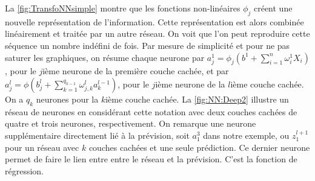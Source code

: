 \begin{figure}[h]
\end{figure}

La \autoref{fig:TransfoNNsimple} montre que les fonctions non-linéaires $\phi_j$ créent une nouvelle représentation de l'information. Cette représentation est alors combinée linéairement et traitée par un autre réseau. On voit que l'on peut reproduire cette séquence un nombre indéfini de fois. Par mesure de simplicité et pour ne pas saturer les graphiques, on résume chaque neurone par $a_j^1 = \phi_j \left(b^1 + \sum_{i=1}^n \omega_i^1 X_i \right)$, pour le $j$ième neurone de la première couche cachée, et par $a_j^l  = \phi \left( b_j^l+ \sum_{k=1}^{q_{k-1}} \omega_{j,k}^l a_k^{l-1} \right)$, pour le $j$ième neurone de la $l$ième couche cachée. On a $q_k$ neurones pour la $k$ième couche cachée. La \autoref{fig:NN:Deep2} illustre un réseau de neurones en considérant cette notation avec deux couches cachées de quatre et trois neurones, respectivement. On remarque une neurone supplémentaire directement lié à la prévision, soit $a_1^3$ dans notre exemple, ou $z_1^{l+1}$ pour un réseau avec $k$ couches cachées et une seule prédiction. Ce dernier neurone permet de faire le lien entre entre le réseau et la prévision. C'est la fonction de régression. 


